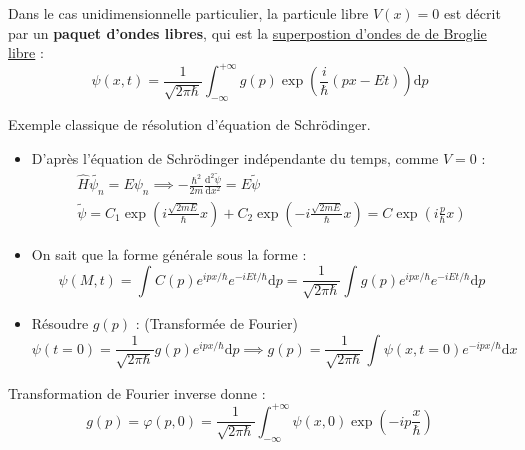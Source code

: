 Dans le cas unidimensionnelle particulier, la particule libre $V(x)=0$ est décrit par un \textbf{paquet d'ondes libres}, qui est la \underline{superpostion d'ondes de de Broglie libre} : 
\begin{equation}
\boxed{  \psi(x,t) = \frac{1}{\sqrt{2 \pi \hbar}} \int_{- \infty}^{+ \infty}g(p) \exp \left( \frac{i}{\hbar} ( p x -Et) \right) \mathrm{d}p}
\end{equation}

\begin{myproof}{}{}
Exemple classique de résolution d'équation de Schrödinger.
\begin{itemize}

    \item D'après l'équation de Schrödinger indépendante du temps, comme $V=0$ : 
      \begin{gather}
        \hat{H} \widetilde{\psi_n} = E \psi_n \implies - \frac{\hbar ^{2}}{2m} \frac{\mathrm{d} ^{2} \widetilde{\psi}}{\mathrm{d} x ^{2}}  = E \widetilde{\psi} \\
        \widetilde{\psi} = C_1 \exp \left( i \frac{\sqrt{2mE}}{\hbar} x \right) + C_2 \exp \left( -i \frac{\sqrt{2mE}}{\hbar} x \right) = C \exp \left( i \frac{p}{\hbar} x \right) 
      \end{gather}

    \item On sait que la forme générale sous la forme : 
      \begin{equation}
        \psi (M,t) = \int_{}^{} C(p) e ^{ipx / \hbar} e ^{-i Et / \hbar} \mathrm{d}p = \frac{1}{\sqrt{2 \pi \hbar}} \int_{}^{}g(p) e ^{ipx /\hbar} e ^{-iEt /\hbar} \mathrm{d}p
      \end{equation}

    \item Résoudre $g(p)$ : (Transformée de Fourier)
      \begin{equation}
        \psi(t=0) = \frac{1}{\sqrt{2 \pi \hbar}}  g(p) e ^{ipx /\hbar} \mathrm{d}p \implies g(p) = \frac{1}{\sqrt{2 \pi \hbar} }  \int_{ }^{} \psi(x, t=0) e ^{-ipx /\hbar} \mathrm{d}x
      \end{equation}

\end{itemize}
\end{myproof}





Transformation de Fourier inverse donne :
\begin{equation}
  g(p) = \varphi(p,0) = \frac{1}{\sqrt{2 \pi \hbar}}  \int_{- \infty}^{+ \infty} \psi(x,0) \exp \left( - ip \frac{x}{\hbar}  \right)
\end{equation}

